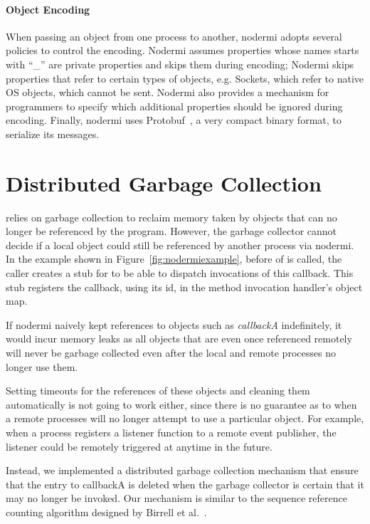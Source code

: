 \paragraph{Object Encoding}
When passing an object from one process to another,
nodermi adopts several policies to control the encoding.
Nodermi assumes properties whose names starts with ``\_'' are
private properties and skips them during encoding;
Nodermi skips properties that refer to certain types of objects, e.g. Sockets,
which refer to native OS objects, which cannot be sent.
Nodermi also provides a mechanism for programmers to specify which
additional properties should be ignored during encoding.
Finally, nodermi uses Protobuf~\cite{protobuf}, a very compact
binary format, to serialize its messages.


\section{Distributed Garbage Collection}
\js{} relies on garbage collection to reclaim memory taken by
objects that can no longer be referenced by the program.
However, the garbage collector cannot decide if a local object
could still be referenced by another process via nodermi.
In the example shown in Figure~\ref{fig:nodermiexample},
before  of  is called,
the caller creates a stub for  to be able
to dispatch invocations of this callback.
This stub registers the callback, using its id, in the
method invocation handler's object map.

If nodermi naively kept references to objects such as
\emph{callbackA} indefinitely, it would incur memory leaks as all
objects that are even once referenced remotely will never be garbage
collected even after the local and remote processes no longer use them.

Setting timeouts for the references of these objects and cleaning
them automatically is not going to work either,
since there is no guarantee as to when a remote processes will
no longer attempt to use a particular object.
For example, when a process registers a listener function to a remote event publisher,
the listener could be remotely triggered at anytime in the future.

Instead, we implemented a distributed garbage collection mechanism
that ensure that the entry to callbackA is deleted when the
garbage collector is certain that it may no longer be invoked.
Our mechanism is similar to the sequence reference counting algorithm
designed by Birrell et al.~\cite{birrell1993distributed}.

